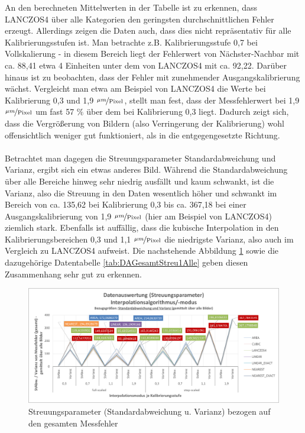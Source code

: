 \documentclass[
fontsize=10pt, 
listof = totoc,
parskip = half	
]{report}
\begin{document}
\noindent An den berechneten Mittelwerten in der Tabelle ist zu erkennen, dass LANCZOS4 über alle Kategorien den geringsten durchschnittlichen Fehler erzeugt. Allerdings zeigen die Daten auch, dass dies nicht repräsentativ für alle Kalibrierungsstufen ist. Man betrachte z.B. Kalibrierungsstufe 0,7 bei Vollskalierung - in diesem Bereich liegt der Fehlerwert von Nächster-Nachbar mit ca. 88,41 etwa 4 Einheiten unter dem von LANCZOS4 mit ca. 92,22. Darüber hinaus ist zu beobachten, dass der Fehler mit zunehmender Ausgangskalibrierung wächst. Vergleicht man etwa am Beispiel von LANCZOS4 die Werte bei Kalibrierung  0,3  und 1,9 $\nicefrac{\mu m}{\text{Pixel}}$, stellt man fest, dass der Messfehlerwert bei 1,9 $\nicefrac{\mu m}{\text{Pixel}}$ um fast 57 $\%$ über dem bei Kalibrierung 0,3 liegt. Dadurch zeigt sich, dass die Vergrößerung von Bildern (also Verringerung der Kalibrierung) wohl offensichtlich weniger gut funktioniert, als in die entgegengesetzte Richtung.
\\\\
Betrachtet man dagegen die Streuungsparameter Standardabweichung und Varianz, ergibt sich ein etwas anderes Bild. Während die Standardabweichung über alle Bereiche hinweg sehr niedrig ausfällt und kaum schwankt, ist die Varianz, also die Streuung in den Daten wesentlich höher und schwankt im Bereich von ca. 135,62 bei Kalibrierung 0,3 bis ca. 367,18 bei einer Ausgangskalibrierung von 1,9 $\nicefrac{\mu m}{\text{Pixel}}$ (hier am Beispiel von LANCZOS4) ziemlich stark. Ebenfalls ist auffällig, dass die kubische Interpolation in den Kalibrierungsbereichen 0,3 und 1,1 $\nicefrac{\mu m}{\text{Pixel}}$ die niedrigste Varianz, also auch im Vergleich zu LANCZOS4 aufweist.  Die nachstehende Abbildung \ref{fig:DAGesamtStreu1Alle} sowie die dazugehörige Datentabelle \ref{tab:DAGesamtStreu1Alle} geben diesen Zusammenhang sehr gut zu erkennen.

\begin{figure}[H]
	\centering
	\includegraphics[width=\textwidth, height=\textheight, keepaspectratio]{pics/DA_Gesamt_Streu1_Alle}
	\caption{Streuungsparameter (Standardabweichung u. Varianz) bezogen auf den gesamten Messfehler}
	\label{fig:DAGesamtStreu1Alle}
\end{figure}
	
\end{document}
